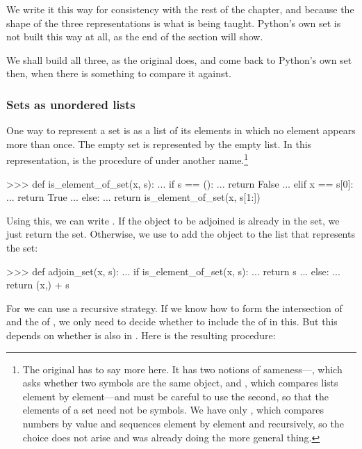 \begin{revealTheSurface}
We write it this way for consistency with the rest of the chapter, and because
the shape of the three representations is what is being taught.  Python's own
set is not built this way at all, as the end of the section will show.

We shall build all three, as the original does, and come back to Python's own
set then, when there is something to compare it against.
\end{revealTheSurface}

\subsubsection*{Sets as unordered lists}

One way to represent a set is as a list of its elements in which no element
appears more than once.  The empty set is represented by the empty list.  In
this representation,  is the procedure 
of  under another name.\footnote{The original has to say
more here.  It has two notions of sameness---, which asks whether two
symbols are the same object, and , which compares lists element by
element---and must be careful to use the second, so that the elements of a set
need not be symbols.  We have only \code{==}, which compares numbers by value
and sequences element by element and recursively, so the choice does not arise
and  was already doing the more general thing.}

\begin{codeBlock}
>>> def is_element_of_set(x, s):
...     if s == ():
...         return False
...     elif x == s[0]:
...         return True
...     else:
...         return is_element_of_set(x, s[1:])
\end{codeBlock}

\noindent
Using this, we can write .  If the object to be adjoined is
already in the set, we just return the set.  Otherwise, we use  to
add the object to the list that represents the set:

\begin{codeBlock}
>>> def adjoin_set(x, s):
...     if is_element_of_set(x, s):
...         return s
...     else:
...         return (x,) + s
\end{codeBlock}

\noindent
For  we can use a recursive strategy.  If we know how
to form the intersection of  and the  of , we
only need to decide whether to include the  of  in this.
But this depends on whether  is also in .  Here is
the resulting procedure:

